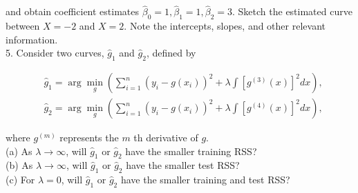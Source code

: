 \documentclass[10pt]{article}
\begin{document}
and obtain coefficient estimates $\hat{\beta}_{0}=1, \hat{\beta}_{1}=1, \hat{\beta}_{2}=3$. Sketch the estimated curve between $X=-2$ and $X=2$. Note the intercepts, slopes, and other relevant information.\\
5. Consider two curves, $\hat{g}_{1}$ and $\hat{g}_{2}$, defined by

$$
\begin{aligned}
& \hat{g}_{1}=\arg \min _{g}\left(\sum_{i=1}^{n}\left(y_{i}-g\left(x_{i}\right)\right)^{2}+\lambda \int\left[g^{(3)}(x)\right]^{2} d x\right), \\
& \hat{g}_{2}=\arg \min _{g}\left(\sum_{i=1}^{n}\left(y_{i}-g\left(x_{i}\right)\right)^{2}+\lambda \int\left[g^{(4)}(x)\right]^{2} d x\right),
\end{aligned}
$$

where $g^{(m)}$ represents the $m$ th derivative of $g$.\\
(a) As $\lambda \rightarrow \infty$, will $\hat{g}_{1}$ or $\hat{g}_{2}$ have the smaller training RSS?\\
(b) As $\lambda \rightarrow \infty$, will $\hat{g}_{1}$ or $\hat{g}_{2}$ have the smaller test RSS?\\
(c) For $\lambda=0$, will $\hat{g}_{1}$ or $\hat{g}_{2}$ have the smaller training and test RSS?
\end{document}
